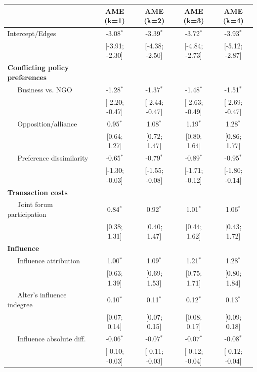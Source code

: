\documentclass[12pt,pdflatex]{elsarticle}
\begin{document}
\begin{table}[ht]
\centering
\begingroup\tiny
\begin{tabular}{lcccc}
   & AME (k=1) & AME (k=2) & AME (k=3) & AME (k=4) \\
  \hline
\hline
Intercept/Edges & -3.08$^{\ast}$ & -3.39$^{\ast}$ & -3.72$^{\ast}$ & -3.93$^{\ast}$ \\
   & [-3.91; -2.30] & [-4.38; -2.50] & [-4.84; -2.73] & [-5.12; -2.87] \\
  \textbf{Conflicting policy preferences} &  &  &  &  \\
  $\;\;\;\;$ Business vs. NGO & -1.28$^{\ast}$ & -1.37$^{\ast}$ & -1.48$^{\ast}$ & -1.51$^{\ast}$ \\
   & [-2.20; -0.47] & [-2.44; -0.47] & [-2.63; -0.49] & [-2.69; -0.47] \\
  $\;\;\;\;$ Opposition/alliance & 0.95$^{\ast}$ & 1.08$^{\ast}$ & 1.19$^{\ast}$ & 1.28$^{\ast}$ \\
   & [0.64; 1.27] & [0.72; 1.47] & [0.80; 1.64] & [0.86; 1.77] \\
  $\;\;\;\;$ Preference dissimilarity & -0.65$^{\ast}$ & -0.79$^{\ast}$ & -0.89$^{\ast}$ & -0.95$^{\ast}$ \\
   & [-1.30; -0.03] & [-1.55; -0.08] & [-1.71; -0.12] & [-1.80; -0.14] \\
  \textbf{Transaction costs} &  &  &  &  \\
  $\;\;\;\;$ Joint forum participation & 0.84$^{\ast}$ & 0.92$^{\ast}$ & 1.01$^{\ast}$ & 1.06$^{\ast}$ \\
   & [0.38; 1.31] & [0.40; 1.47] & [0.44; 1.62] & [0.43; 1.72] \\
  \textbf{Influence} &  &  &  &  \\
  $\;\;\;\;$ Influence attribution & 1.00$^{\ast}$ & 1.09$^{\ast}$ & 1.21$^{\ast}$ & 1.28$^{\ast}$ \\
   & [0.63; 1.39] & [0.69; 1.53] & [0.75; 1.71] & [0.80; 1.84] \\
  $\;\;\;\;$ Alter's influence indegree & 0.10$^{\ast}$ & 0.11$^{\ast}$ & 0.12$^{\ast}$ & 0.13$^{\ast}$ \\
   & [0.07; 0.14] & [0.07; 0.15] & [0.08; 0.17] & [0.09; 0.18] \\
  $\;\;\;\;$ Influence absolute diff. & -0.06$^{\ast}$ & -0.07$^{\ast}$ & -0.07$^{\ast}$ & -0.08$^{\ast}$ \\
   & [-0.10; -0.03] & [-0.11; -0.03] & [-0.12; -0.04] & [-0.12; -0.04] \\

\end{tabular}
\end{table}
\end{document}
